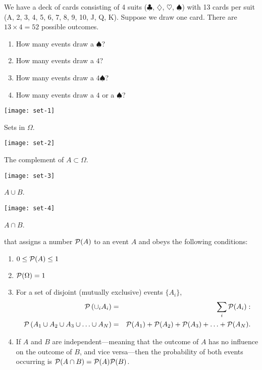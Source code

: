 \begin{exercisebox}
We have a deck of cards consisting of 4 suits ($\clubsuit$, $\diamondsuit$, $\heartsuit$, $\spadesuit$) with 13 cards per suit (A, 2, 3, 4, 5, 6, 7, 8, 9, 10, J, Q, K).  Suppose we draw one card.  There are $13\times 4=52$ possible outcomes.
\begin{enumerate}
\item How many events draw a $\spadesuit$?
\item How many events draw a $4$?
\item How many events draw a $4\spadesuit$?
\item How many events draw a $4$ or a $\spadesuit$?
\end{enumerate}
\label{ex.card-deck}
\end{exercisebox}

\begin{marginfigure}
\texttt{[image: set-1]}
\caption[Sets]{Sets in $\Omega$.}
\label{f.set-1}
\end{marginfigure}
\begin{marginfigure}
\texttt{[image: set-2]}
\caption[The complement of a set]{The complement of $A\subset\Omega$.}
\label{f.set-2}
\end{marginfigure}
\begin{marginfigure}
\texttt{[image: set-3]}
\caption[The union of two sets]{$A\cup B$.}
\label{f.set-3}
\end{marginfigure}
\begin{marginfigure}
\texttt{[image: set-4]}
\caption[The intersection of two sets]{$A\cap B$.}
\label{f.set-4}
\end{marginfigure}

 that assigns a number $\mathcal{P}(A)$ to an event $A$ and obeys the following conditions:
\begin{enumerate}
\item $0\le\mathcal{P}(A) \le 1$
\item $\mathcal{P}(\Omega) = 1$
\item For a set of disjoint (mutually exclusive) events $\{A_{i}\}$,
\begin{eqnarray*}
 \mathcal{P}\left(\cup_{i}A_{i}\right) &=& \sum_{i}\mathcal{P}(A_{i}):\\
 \mathcal{P}\left(A_{1}\cup A_{2}\cup A_{3}\cup\ldots\cup A_{N}\right) &=&
 	\mathcal{P}(A_{1})+\mathcal{P}(A_{2}) + \mathcal{P}(A_{3}) +\ldots+\mathcal{P}(A_{N}).
\end{eqnarray*}
\item If $A$ and $B$ are independent---meaning that the outcome of $A$ has no influence on the outcome of $B$, and vice versa---then the probability of both events occurring is $\mathcal{P}(A\cap B) = \mathcal{P}(A)\mathcal{P}(B)$.
\end{enumerate}

